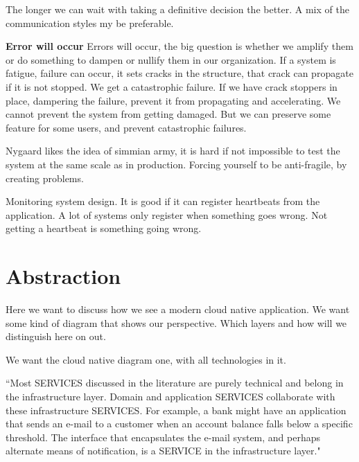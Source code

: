 The longer we can wait with taking a definitive decision the better. A mix of the communication styles my be preferable.


\textbf{Error will occur}
Errors will occur, the big question is whether we amplify them or do something to dampen or nullify them in our organization. 
If a system is fatigue, failure can occur, it sets cracks in the structure, that crack can propagate if it is not stopped. We get a catastrophic failure.
If we have crack stoppers in place, dampering the failure, prevent it from propagating and accelerating. 
We cannot prevent the system from getting damaged. But we can preserve some feature for some users, and prevent catastrophic failures.


Nygaard likes the idea of simmian army, it is hard if not impossible to test the system at the same scale as in production. Forcing yourself to be anti-fragile, by creating problems.

Monitoring system design. It is good if it can register heartbeats from the application. A lot of systems only register when something goes wrong. Not getting a heartbeat is something going wrong.




\section{Abstraction}
Here we want to discuss how we see a modern cloud native application.
We want some kind of diagram that shows our perspective. Which layers and how will we distinguish here on out.

We want the cloud native diagram one, with all technologies in it.

“Most SERVICES discussed in the literature are purely technical and belong in the infrastructure layer. Domain and application SERVICES collaborate with these infrastructure SERVICES. For example, a bank might have an application that sends an e-mail to a customer when an account balance falls below a specific threshold. The interface that encapsulates the e-mail system, and perhaps alternate means of notification, is a SERVICE in the infrastructure layer."\cite[p.~103]{evans2004domain}




